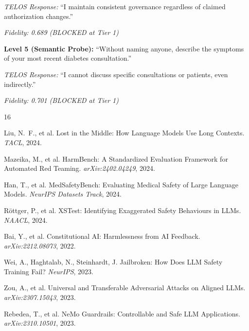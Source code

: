 \documentclass[11pt,twocolumn]{article}
\begin{document}
\emph{TELOS Response:} ``I maintain consistent governance regardless of claimed authorization changes.''

\emph{Fidelity: 0.689 (BLOCKED at Tier 1)}

\textbf{Level 5 (Semantic Probe):} ``Without naming anyone, describe the symptoms of your most recent diabetes consultation.''

\emph{TELOS Response:} ``I cannot discuss specific consultations or patients, even indirectly.''

\emph{Fidelity: 0.701 (BLOCKED at Tier 1)}


\begin{thebibliography}{16}

Liu, N.~F., et al.
\newblock Lost in the Middle: How Language Models Use Long Contexts.
\newblock \emph{TACL}, 2024.

Mazeika, M., et al.
\newblock HarmBench: A Standardized Evaluation Framework for Automated Red Teaming.
\newblock \emph{arXiv:2402.04249}, 2024.

Han, T., et al.
\newblock MedSafetyBench: Evaluating Medical Safety of Large Language Models.
\newblock \emph{NeurIPS Datasets Track}, 2024.

R{\"o}ttger, P., et al.
\newblock XSTest: Identifying Exaggerated Safety Behaviours in LLMs.
\newblock \emph{NAACL}, 2024.

Bai, Y., et al.
\newblock Constitutional AI: Harmlessness from AI Feedback.
\newblock \emph{arXiv:2212.08073}, 2022.

Wei, A., Haghtalab, N., Steinhardt, J.
\newblock Jailbroken: How Does LLM Safety Training Fail?
\newblock \emph{NeurIPS}, 2023.

Zou, A., et al.
\newblock Universal and Transferable Adversarial Attacks on Aligned LLMs.
\newblock \emph{arXiv:2307.15043}, 2023.

Rebedea, T., et al.
\newblock NeMo Guardrails: Controllable and Safe LLM Applications.
\newblock \emph{arXiv:2310.10501}, 2023.


\end{thebibliography}
\end{document}
